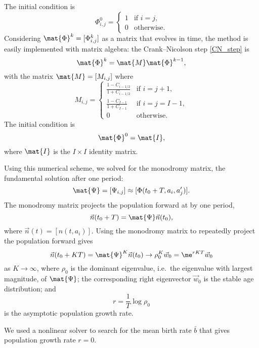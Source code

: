 \documentclass{jpmarticle}
\begin{document}
The initial condition is
\begin{equation}
  \Phi_{i, j}^0 =
  \begin{cases}
    1 & \text{if $i = j$}, \\
    0 & \text{otherwise}.
  \end{cases}
\end{equation}
Considering $\mat{\Phi}^k = [\Phi_{i, j}^k]$ as a matrix that
evolves in time, the method is easily implemented with matrix algebra:
the Crank--Nicolson step \eqref{CN_step} is
\begin{equation}
  \mat{\Phi}^k = \mat{M} \mat{\Phi}^{k - 1},
\end{equation}
with the matrix $\mat{M} = [M_{i, j}]$ where
\begin{equation}
  M_{i, j} =
  \begin{cases}
    \frac{1 - C_{i - 1 / 2}}{1 + C_{i - 1 / 2}}
    & \text{if $i = j + 1$}, \\
    \frac{1 - C_{I - 1}}{1 + C_{I - 1}} & \text{if $i = j = I - 1$}, \\
    0 & \text{otherwise}.
  \end{cases}
\end{equation}
The initial condition is
\begin{equation}
  \mat{\Phi}^0 = \mat{I},
\end{equation}
where $\mat{I}$ is the $I \times I$ identity matrix.

Using this numerical scheme, we solved for the monodromy matrix, the
fundamental solution after one period:
\begin{equation}
  \mat{\Psi} = [\Psi_{i, j}] \approx [\Phi(t_0 + T, a_i, a'_j)].
\end{equation}
The monodromy matrix projects the population forward at by one period,
\begin{equation}
  \vec{n}(t_0 + T) = \mat{\Psi} \vec{n}(t_0),
\end{equation}
where $\vec{n}(t) = [n(t, a_i)]$.
Using the monodromy matrix to repeatedly project the population
forward gives
\begin{equation}
  \vec{n}(t_0 + K T)
  = \mat{\Psi}^K \vec{n}(t_0)
  \to \rho_0^K \vec{w}_0
  = \me^{r K T} \vec{w}_0
\end{equation}
as $K \to \infty$,
where $\rho_0$ is the dominant eigenvalue, i.e.~the eigenvalue with
largest magnitude, of $\mat{\Psi}$;
the corresponding right eigenvector $\vec{w}_0$ is the stable age
distribution; and
\begin{equation}
  r = \frac{1}{T} \log \rho_0
\end{equation}
is the asymptotic population growth rate.

We used a nonlinear solver to search for the mean birth rate $\bar{b}$
that gives population growth rate $r = 0$.

\printbibliography
\end{document}
